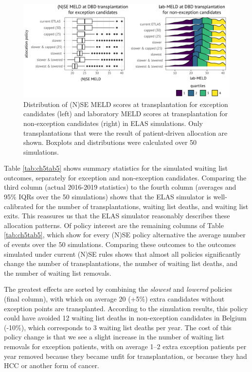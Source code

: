 \documentclass[11pt,twoside,]{book}
\begin{document}
\begin{figure}[ht]

{\centering \includegraphics[width=1\linewidth]{figures/ch5//fig3-results_BELIAC} 

}

\caption{Distribution of (N)SE MELD scores at transplantation for exception candidates (left) and laboratory MELD scores at transplantation for non-exception candidates (right) in ELAS simulations. Only transplantations that were the result of patient-driven allocation are shown. Boxplots and distributions were calculated over 50 simulations.}\label{fig:ch5fig3}
\end{figure}

\FloatBarrier
\newpage
Table \ref{tab:ch5tab5} shows summary statistics for the simulated waiting list outcomes,
separately for exception and non-exception candidates. Comparing the third column (actual 2016-2019 statistics) to
the fourth column (averages and 95\% IQRs over the 50 simulations) shows that
the ELAS simulator is well-calibrated for the number of
transplantations, waiting list deaths, and waiting list exits. This
reassures us that the ELAS simulator reasonably describes these
allocation patterns. Of policy interest are the remaining columns of
Table \ref{tab:ch5tab5}, which show for every (N)SE policy alternative
the average number of events over the 50 simulations. Comparing
these outcomes to the outcomes simulated under current (N)SE rules shows
that almost all policies significantly change the number of
transplantations, the number of waiting list deaths, and the number of
waiting list removals.

The greatest effects are sorted by combining the \emph{slowest} and \emph{lowered} policies
(final column), with which on average 20 (+5\%) extra candidates without exception
points are transplanted. According to the simulation results, this policy could
have avoided 12 waiting list deaths in non-exception candidates in Belgium (-10\%),
which corresponds to 3 waiting list deaths per year. The cost of this policy change
is that we see a slight increase in the number of waiting list removals for
exception patients, with on average 1--2 extra exception patients per year
removed because they became unfit for transplantation, or because they had HCC
or another form of cancer.
\end{document}
